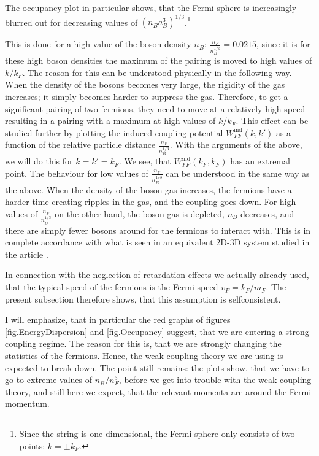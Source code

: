 The occupancy plot in particular shows, that the Fermi sphere is increasingly blurred out for decreasing values of $(n_Ba_B^3)^{1/3}$.\footnote{Since the string is one-dimensional, the Fermi sphere only consists of two points: $k = \pm k_F$.} 

This is done for a high value of the boson density $n_B$: $\frac{n_F}{n_B^{1/3}} = 0.0215$, since it is for these high boson densities the maximum of the pairing is moved to high values of $k/k_F$. The reason for this can be understood physically in the following way. When the density of the bosons becomes very large, the rigidity of the gas increases; it simply becomes harder to suppress the gas. Therefore, to get a significant pairing of two fermions, they need to move at a relatively high speed resulting in a pairing with a maximum at high values of $k/k_F$. This effect can be studied further by plotting the induced coupling potential $W_{FF}^{\text{ind}}(k,k')$ as a function of the relative particle distance $\frac{n_F}{n_B^{1/3}}$. With the arguments of the above, we will do this for $k = k' = k_F$. We see, that $W_{FF}^{\text{ind}}(k_F,k_F)$ has an extremal point. The behaviour for low values of $\frac{n_F}{n_B^{1/3}}$ can be understood in the same way as the above. When the density of the boson gas increases, the fermions have a harder time creating ripples in the gas, and the coupling goes down. For high values of $\frac{n_F}{n_B^{1/3}}$ on the other hand, the boson gas is depleted, $n_B$ decreases, and there are simply fewer bosons around for the fermions to interact with. This is in complete accordance with what is seen in an equivalent 2D-3D system studied in the article \cite{BruunZhigangTopSuperfluid}. 

In connection with the neglection of retardation effects we actually already used, that the typical speed of the fermions is the Fermi speed $v_F = k_F/m_F$. The present subsection therefore shows, that this assumption is selfconsistent. 

I will emphasize, that in particular the red graphs of figures \ref{fig.EnergyDispersion} and \ref{fig.Occupancy} suggest, that we are entering a strong coupling regime. The reason for this is, that we are strongly changing the statistics of the fermions. Hence, the weak coupling theory we are using is expected to break down. The point still remains: the plots show, that we have to go to extreme values of $n_B/n_F^3$, before we get into trouble with the weak coupling theory, and still here we expect, that the relevant momenta are around the Fermi momentum. 


